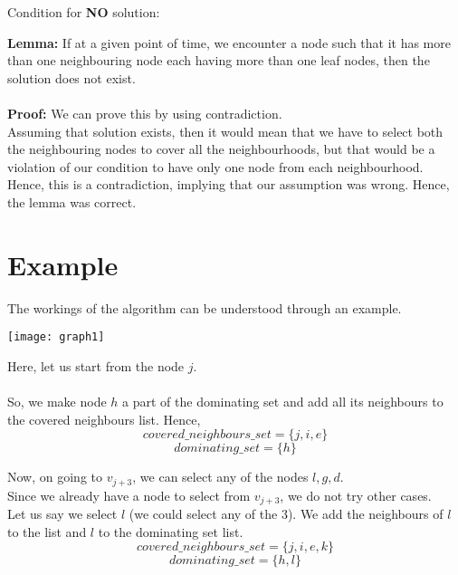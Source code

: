\documentclass[letterpaper, 11pt]{article}
\begin{document}
\begin{adjustwidth}{0.5cm}{}
    Condition for \textbf{NO} solution:

\textbf{Lemma:} If at a given point of time, we encounter a node such that it has more than one neighbouring node each having more than one leaf nodes, then the solution does not exist.\\\\
\textbf{Proof:} We can prove this by using contradiction.\\
Assuming that solution exists, then it would mean that we have to select both the neighbouring nodes to cover all the neighbourhoods, but that would be a violation of our condition to have only one node from each neighbourhood. \\
Hence, this is a contradiction, implying that our assumption was wrong. Hence, the lemma was correct.

\end{adjustwidth}

\section{Example}
\label{sec:example}
The workings of the algorithm can be understood through an example.\\
\begin{center}
  \texttt{[image: graph1]}  
\end{center}


Here, let us start from the node $j$.\\\\
So, we make node $h$ a part of the dominating set and add all its neighbours to the covered neighbours list. Hence,
\begin{equation*}
    covered\_neighbours\_set  = \{ j,i,e \} 
\end{equation*}
\begin{equation*}
    dominating\_set = \{ h \}
\end{equation*}

Now, on going to $v_{j+3}$, we can select any of the nodes $l,g,d$.\\
Since we already have a node to select from  $v_{j+3}$, we do not try other cases.\\
Let us say we select $l$ (we could select any of the 3).
We add the neighbours of $l$ to the list and $l$ to the dominating set list. 
\begin{equation*}
    covered\_neighbours\_set  = \{ j,i,e,k \} 
\end{equation*}
\begin{equation*}
    dominating\_set = \{ h,l \}
\end{equation*}
\end{document}

